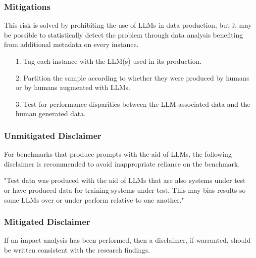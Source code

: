 \subsubsection{Mitigations}
This risk is solved by prohibiting the use of LLMs in data production, but it may be possible to statistically detect the problem through data analysis benefiting from additional metadata on every instance.
\begin{itemize}
\item[1.]Tag each instance with the LLM(s) used in its production.
\item[2.]Partition the sample according to whether they were produced by humans or by humans augmented with LLMs.
\item[3.]Test for performance disparities between the LLM-associated data and the human generated data.
\end{itemize}


\subsubsection{Unmitigated Disclaimer}
For benchmarks that produce prompts with the aid of LLMs, the following disclaimer is recommended to avoid inappropriate reliance on the benchmark.

\begin{center}
    \begin{tcolorbox}[colback=gray!10, colframe=black!50, width=\textwidth, boxrule=0.5mm, sharp corners, coltext=black]
"Test data was produced with the aid of LLMs that are also systems under test or have produced data for training systems under test. This may bias results so some LLMs over or under perform relative to one another."
    \end{tcolorbox}
\end{center}



\subsubsection{Mitigated Disclaimer}
If an impact analysis has been performed, then a disclaimer, if warranted, should be written consistent with the research findings.
